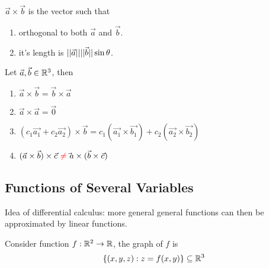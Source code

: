 \documentclass[]{article}
\begin{document}
            \begin{remark} $\vec{a} \times \vec{b}$ is the vector such that
                \begin{enumerate}
                    \item orthogonal to both $\vec{a}$ and $\vec{b}$.
                    \item it's length is $\vert \vert \vec{{a}} \vert \vert\vert \vert \vec{{b}} \vert \vert\sin{\theta}$.
                \end{enumerate}
            \end{remark}
            
            \begin{prop} Let $\vec{a}, \vec{b} \in \mathbb{R}^3$, then
                \begin{enumerate}
                    \item $\vec{a} \times \vec{b} = \vec{b} \times \vec{a}$
                    \item $\vec{a} \times \vec{a} = \vec{0}$
                    \item $(c_1 \vec{a_1} + c_2 \vec{a_2}) \times \vec{b} = c_1 (\vec{a_1} \times \vec{b_1}) + c_2 (\vec{a_2} \times \vec{b_2})$
                    \item $(\vec{a} \times \vec{b}) \times \vec{c} \textcolor{red}{\ \neq\ } \vec{}{a} \times (\vec{b} \times \vec{c})$
                \end{enumerate}
            \end{prop}
    \subsection{Functions of Several Variables}
        \begin{remark}
            Idea of differential calculus: more general general functions can then be approximated by linear functions.
        \end{remark}
        
        \begin{defn}
            Consider function ${f}: {\mathbb{R}^2} \to {\mathbb{R}}$, the graph of $f$ is 
            \[
                \{(x,y,z): z = f(x,y)\} \subseteq \mathbb{R}^3
            \]
        \end{defn}
\end{document}

